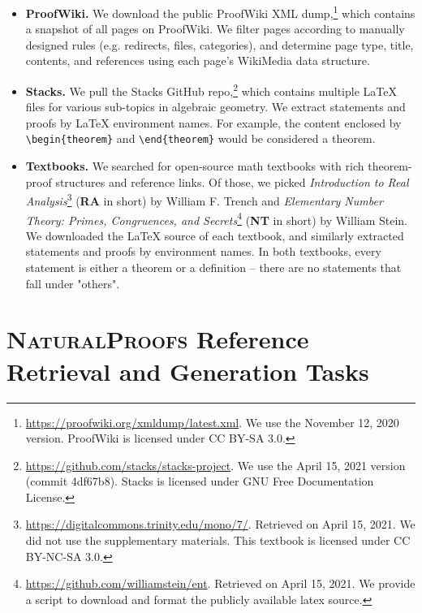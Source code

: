\begin{itemize}[itemsep=0cm,leftmargin=0.3cm,topsep=0cm]
\item \textbf{ProofWiki.}
We download the public ProofWiki XML dump,\footnote{\url{https://proofwiki.org/xmldump/latest.xml}. We use the November 12, 2020 version. ProofWiki is licensed under CC BY-SA 3.0.} which contains a snapshot of all pages on ProofWiki.
We filter pages according to manually designed rules (e.g. redirects, files, categories), and determine page type, title, contents, and references using each page's WikiMedia data structure.
\item \textbf{Stacks.}
We pull the Stacks GitHub repo,\footnote{\url{https://github.com/stacks/stacks-project}. We use the April 15, 2021 version (commit 4df67b8). Stacks is licensed under GNU Free Documentation License.} which contains multiple \LaTeX{} files for various sub-topics in algebraic geometry.
We extract statements and proofs by \LaTeX{} environment names.
For example, the content enclosed by \texttt{\textbackslash{}begin\{theorem\}} and \texttt{\textbackslash{}end\{theorem\}} would be considered a theorem.
\item \textbf{Textbooks.}
We searched for open-source math textbooks with rich theorem-proof structures and reference links.
Of those, we picked \textit{Introduction to Real Analysis}\footnote{\url{https://digitalcommons.trinity.edu/mono/7/}. Retrieved on April 15, 2021. We did not use the supplementary materials. This textbook is licensed under CC BY-NC-SA 3.0.} (\textbf{RA} in short) by William F. Trench and \textit{Elementary Number Theory: Primes, Congruences, and Secrets}\footnote{\url{https://github.com/williamstein/ent}. Retrieved on April 15, 2021. We provide a script to download and format the publicly available latex source.} (\textbf{NT} in short) by William Stein.
We downloaded the \LaTeX{} source of each textbook, and similarly extracted statements and proofs by environment names.
In both textbooks, every statement is either a theorem or a definition -- there are no statements that fall under "others".
\end{itemize}

\section{\textsc{NaturalProofs} Reference Retrieval and Generation Tasks}
\label{sec:task}

